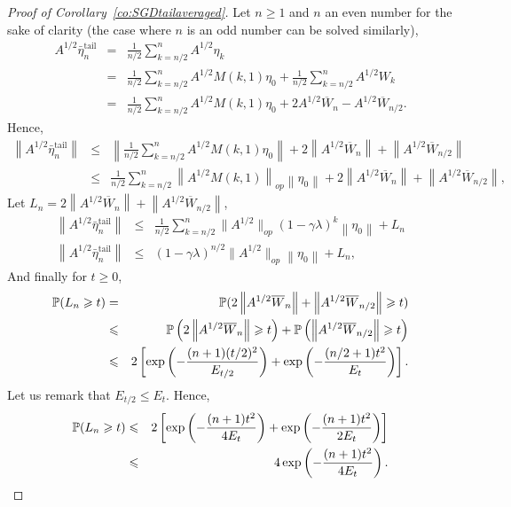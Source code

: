 \begin{proof} [Proof of Corollary~\ref{co:SGDtailaveraged}] 

Let $n \geqslant 1$ and $n$ an even number for the sake of clarity (the case where $n$ is an odd number can be solved similarly), 
\begin{eqnarray*}
A^{1/2}\bar{\eta}_n^{\textrm {tail}} &=& \frac{1}{ n / 2} \sum_{k= n/2}^{n}A^{1/2} \eta_k \\
&=& \frac{1}{n/2 } \sum_{k= n/2 }^{n} A^{1/2}M(k,1)\eta_0 +\frac{1}{ n/2 } \sum_{k= n/2 }^{n} A^{1/2}W_k \\
&=& \frac{1}{ n/2 } \sum_{k= n/2 }^{n}A^{1/2}M(k,1)\eta_0 +2 A^{1/2}\overline{W}_{n} -  A^{1/2}\overline{W}_{ n/2 }.
\end{eqnarray*}
Hence,
\begin{eqnarray*}
\left\| A^{1/2}\bar{\eta}_n^{\textrm {tail}} \right\| &\leqslant & \left\| \frac{1}{n/2} \sum_{k= n/2 }^{n} A^{1/2} M(k,1)\eta_0 \right\|+2 \left\| A^{1/2}\overline{W}_{n} \right\|+ \left\| A^{1/2} \overline{W}_{ n/2 } \right\|\\
&\leqslant & \frac{1}{ n/2 } \sum_{k= n/2 }^{n} \left\| A^{1/2}M(k,1)\right\|_{op} \left\| \eta_0 \right\|+2 \left\| A^{1/2}\overline{W}_{n} \right\|+ \left\| A^{1/2} \overline{W}_{ n/2 } \right\|,
\end{eqnarray*}
Let $L_n = 2 \left\| A^{1/2}\overline{W}_{n} \right\|+ \left\|A^{1/2}  \overline{W}_{ n/2} \right\|$,
\begin{eqnarray*}
\left\| A^{1/2}\bar{\eta}_n^{\textrm {tail}} \right\| &\leqslant & \frac{1}{ n/2 } \sum_{k= n/2 }^{n} \|A^{1/2}\|_{op}(1-\gamma\lambda)^{k} \left\| \eta_0 \right\|+L_n\\
\left\| A^{1/2} \bar{\eta}_n^{\textrm {tail}} \right\| &\leqslant &  (1-\gamma\lambda)^{n/2} \|A^{1/2}\|_{op} \left\| \eta_0 \right\|+L_n,
\end{eqnarray*}
And finally for $t \geqslant 0$,
\begin{eqnarray*}
\P(L_n \geqslant t ) &=& \P(2 \left\| A^{1/2}\overline{W}_{n} \right\|+ \left\| A^{1/2} \overline{W}_{n/2} \right\| \geqslant t ) \\
&\leqslant& \P\left(2 \left\| A^{1/2}\overline{W}_{n} \right\| \geqslant t\right)+\P\left( \left\| A^{1/2} \overline{W}_{n/2} \right\| \geqslant t \right) \\
&\leqslant& 2\left[\exp\left(-\frac{(n+1) (t/2)^2}{E_{t/2}} \right) + \exp\left(-\frac{(n/2+1)t^2}{E_t} \right)\right] .
\end{eqnarray*}
Let us remark that $ E_{t/2} \leqslant E_t $. Hence,
\begin{eqnarray*}
\P(L_n \geqslant t ) &\leqslant& 2\left[\exp\left(-\frac{(n+1) t^2}{4E_t} \right) + \exp\left(-\frac{(n+1) t^2}{2E_t} \right)\right] \\
&\leqslant& 4 \exp\left(-\frac{(n+1) t^2}{4E_t} \right). 
\end{eqnarray*}

\end{proof}


